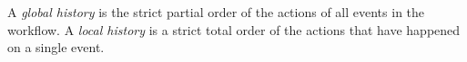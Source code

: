     \newpar 
    A \textit{global history} is the strict partial order of the actions of all events in the workflow. A \textit{local history} is a strict total order of the actions that have happened on a single event. 
	

	
	
%	
%	
%	
%	
